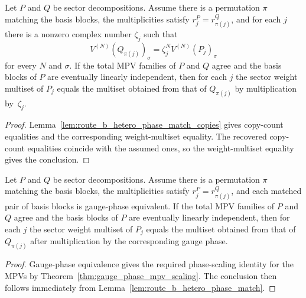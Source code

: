 \begin{lemma}%
\label{lem:route_b_hetero_phase_match}
	\leanok
	Let $P$ and $Q$ be sector decompositions. Assume there is a permutation
	$\pi$ matching the basis blocks, the multiplicities satisfy
	$r_j^P = r_{\pi(j)}^Q$, and for each $j$ there is a nonzero complex number
	$\zeta_j$ such that
	\[
		V^{(N)}(Q_{\pi(j)})_\sigma = \zeta_j^N V^{(N)}(P_j)_\sigma
	\]
	for every $N$ and $\sigma$. If the total MPV families of $P$ and $Q$
	agree and the basis blocks of $P$ are eventually linearly independent,
	then for each $j$ the sector weight multiset of $P_j$ equals the
	multiset obtained from that of $Q_{\pi(j)}$ by multiplication by~$\zeta_j$.
\end{lemma}

\begin{proof}
	\leanok
	Lemma~\ref{lem:route_b_hetero_phase_match_copies} gives copy-count
	equalities and the corresponding weight-multiset equality. The recovered
	copy-count equalities coincide with the assumed ones, so the weight-multiset
	equality gives the conclusion.
\end{proof}

\begin{lemma}%
\label{lem:route_b_hetero_matched_basis}
	\leanok
	Let $P$ and $Q$ be sector decompositions. Assume there is a permutation
	$\pi$ matching the basis blocks, the multiplicities satisfy
	$r_j^P = r_{\pi(j)}^Q$, and each matched pair of basis blocks is
	gauge-phase equivalent. If the total MPV families of $P$ and $Q$ agree
	and the basis blocks of $P$ are eventually linearly independent, then
	for each $j$ the sector weight multiset of $P_j$ equals the multiset
	obtained from that of $Q_{\pi(j)}$ after multiplication by the
	corresponding gauge phase.
\end{lemma}

\begin{proof}
	\leanok
	Gauge-phase equivalence gives the required phase-scaling identity for the
	MPVs by Theorem~\ref{thm:gauge_phase_mpv_scaling}. The conclusion then
	follows immediately from
	Lemma~\ref{lem:route_b_hetero_phase_match}.
\end{proof}

